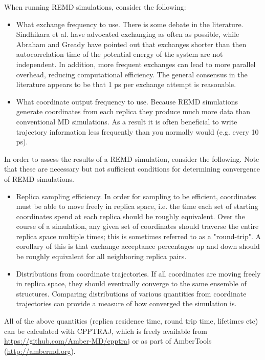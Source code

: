 When running REMD simulations, consider the following:
\begin{itemize}
  \item What exchange frequency to use. There is some debate in the literature. Sindhikara et al. have advocated exchanging as often as possible,\citep{Sindhikara2010} while Abraham and Gready have pointed out that exchanges shorter than then autocorrelation time of the potential energy of the system are not independent.\citep{Abraham2008} In addition, more frequent exchanges can lead to more parallel overhead, reducing computational efficiency. The general consensus in the literature appears to be that 1 ps per exchange attempt is reasonable.
  \item What coordinate output frequency to use. Because REMD simulations generate coordinates from each replica they produce much more data than conventional MD simulations. As a result it is often beneficial to write trajectory information less frequently than you normally would (e.g. every 10 ps). 
\end{itemize}

In order to assess the results of a REMD simulation, consider the following. Note that these are necessary but not sufficient conditions for determining convergence of REMD simulations.
\begin{itemize}
  \item Replica sampling efficiency. In order for sampling to be efficient, coordinates must be able to move freely in replica space, i.e. the time each set of starting coordinates spend at each replica should be roughly equivalent. Over the course of a simulation, any given set of coordinates should traverse the entire replica space multiple times; this is sometimes referred to as a "round-trip". A corollary of this is that exchange acceptance percentages up and down should be roughly equivalent for all neighboring replica pairs.
  \item Distributions from coordinate trajectories. If all coordinates are moving freely in replica space, they should eventually converge to the same ensemble of structures. Comparing distributions of various quantities from coordinate trajectories can provide a measure of how converged the simulation is. 
\end{itemize}

All of the above quantities (replica residence time, round trip time, lifetimes etc) can be calculated with CPPTRAJ,\citep{Roe2013} which is freely available from \url{https://github.com/Amber-MD/cpptraj} or as part of AmberTools (\url{http://ambermd.org}).

